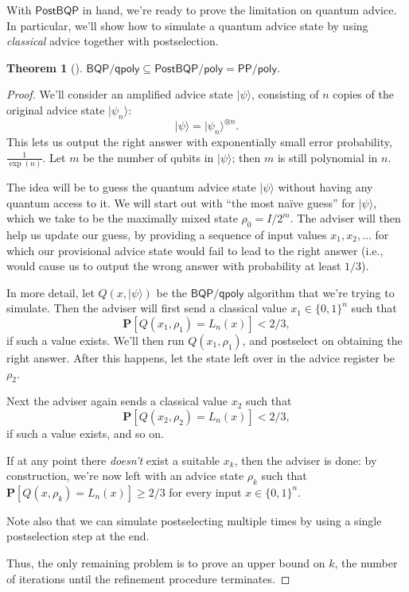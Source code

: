 \documentclass[11pt]{report}
\theoremstyle{plain}
\newtheorem{theorem}{Theorem}[section]
\theoremstyle{definition}
\renewcommand{\Pr}{\mathbf{P}}
\renewcommand{\ket}[1]{|#1\rangle}
\begin{document}
With $\mathsf{PostBQP}$ in hand, we're ready to prove the limitation on quantum advice.  In particular, we'll show how to
simulate a quantum advice state by using {\em classical} advice together with postselection.
\begin{theorem}[\cite{aar:adv}]
\label{bqpqpolyub}
   $\mathsf{BQP/qpoly} \subseteq \mathsf{PostBQP/poly} = \mathsf{PP/poly}$.
\end{theorem}
\begin{proof}
We'll consider an amplified advice state $\ket{ \psi }$, consisting of $n$ copies of the original advice state $\ket{ \psi_n }$:
$$ \ket{ \psi }  = \ket{ \psi_n }^{\otimes n}. $$
This lets us output the right answer with exponentially small error probability, $\frac{1}{\exp ( n)}$.
Let $m$ be the number of qubits in $\ket{\psi}$; then $m$ is still polynomial in $n$.

The idea will be to guess the quantum advice state $\ket{\psi}$ without having any quantum access to it.
We will start out with ``the most na\"{i}ve guess'' for $\ket{\psi}$, which we take to be the maximally mixed state $\rho_0={I}/{2^m}$.
The adviser will then help us update our guess, by providing a sequence of input values $x_1,x_2,\ldots$ for which our provisional advice state would fail to lead to the right answer (i.e., would cause us to output the wrong answer with probability at least $1/3$).

In more detail, let $Q(x,\ket{\psi})$ be the $\mathsf{BQP/qpoly}$ algorithm that we're trying to simulate.  Then the adviser will first send a classical value $x_1 \in \{ 0, 1\}^n$ such that
$$\Pr[Q(x_1, \rho_1) = L_n(x)]< 2/3,$$
if such a value exists.  We'll then run $Q(x_1,\rho_1)$, and postselect on obtaining the right answer.  After this happens, let the state left over in the advice register
be $\rho_2$.

Next the adviser again sends a classical value $x_2$ such that
$$\Pr[Q(x_2, \rho_2) = L_n(x)]< 2/3,$$
if such a value exists, and so on.

If at any point there {\em doesn't} exist a suitable $x_k$, then the adviser is done: by construction, we're now left with an advice state $\rho_k$ such that $\Pr[Q(x, \rho_k) = L_n(x)]\geq 2/3$ for every input $x\in \{0,1\}^n$.

Note also that we can simulate postselecting multiple times by using a single postselection step at the end.

Thus, the only remaining problem is to prove an upper bound on $k$, the number of iterations until the refinement procedure terminates.


\end{proof}
\end{document}
